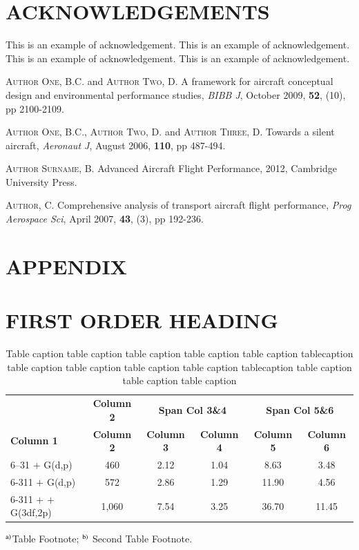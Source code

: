 \documentclass{isabec} %
\begin{document}
\vspace*{-15pt}
\section*{ACKNOWLEDGEMENTS}
This is an example of acknowledgement\cite{author1,author2}. This is an example of acknowledgement\cite{author3}. This is an example of acknowledgement. This is an example of acknowledgement\cite{author4}.

\begin{thebibliography}{0}%
\textsc{Author One, B.C.} and \textsc{Author Two, D.} A framework for aircraft conceptual design and environmental performance studies, \textit{BIBB J}, October 2009, \textbf{52}, (10), pp 2100-2109.

\textsc{Author One, B.C.}, \textsc{Author Two, D.} and \textsc{Author Three, D.} Towards a silent aircraft, \textit{Aeronaut J}, August 2006, \textbf{110}, pp 487-494.

\textsc{Author Surname, B.} Advanced Aircraft Flight Performance, 2012, Cambridge University Press.

\textsc{Author, C.} Comprehensive analysis of transport aircraft flight performance, \textit{Prog Aerospace Sci}, April
2007, \textbf{43}, (3), pp 192-236.

\end{thebibliography}

\setcounter{section}{0}
\section*{APPENDIX}
\section{FIRST ORDER HEADING}

\begin{table}[h]
\caption{Table caption table caption table caption table caption table caption table\break caption table caption table caption table caption table caption table\break caption table caption table caption table caption}
\label{tab4}
\centering
\begin{tabular}{@{}lccccc@{}}
&{\bf Column 2}&\multicolumn{2}{c}{{\bf Span Col 3\&4}} &\multicolumn{2}{c}{{\bf Span Col 5\&6}}\\
{\bf Column 1} &{\bf Column 2} &{\bf Column 3} &{\bf Column 4} &{\bf Column 5} &{\bf Column 6}\\[6pt]
6--31 $+$ G(d,p) &460 &2.12 &1.04 &8.63 &3.48\\
6-311 $+$ G(d,p) &572 &2.86 &1.29 &11.90 &4.56\\
6-311 $+$ $+$ G(3df,2p) &1,060 &7.54 &3.25 &36.70 &11.45\\
\end{tabular}
\begin{tabnote}
$^{\rm a)}$Table Footnote; $^{\rm b)}$ Second Table Footnote.
\end{tabnote}
\end{table}

\end{document}
